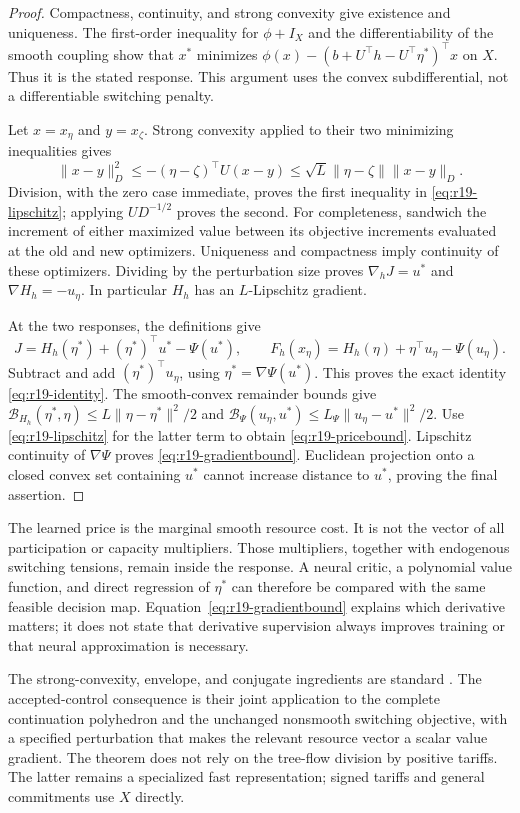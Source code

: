 \documentclass[11pt,letterpaper]{article}
\theoremstyle{definition}
\newcommand{\1}{\mathbf 1}
\begin{document}
\begin{proof}
Compactness, continuity, and strong convexity give existence and uniqueness. The first-order inequality for $\phi+I_X$ and the differentiability of the smooth coupling show that $x^*$ minimizes $\phi(x)-(b+U^\top h- U^\top\eta^*)^\top x$ on $X$. Thus it is the stated response. This argument uses the convex subdifferential, not a differentiable switching penalty.

Let $x=x_\eta$ and $y=x_\zeta$. Strong convexity applied to their two minimizing inequalities gives
\[
 \|x-y\|_D^2\leq-(\eta-\zeta)^\top U(x-y)
 \leq\sqrt L\|\eta-\zeta\|\|x-y\|_D.
\]
Division, with the zero case immediate, proves the first inequality in \eqref{eq:r19-lipschitz}; applying $UD^{-1/2}$ proves the second. For completeness, sandwich the increment of either maximized value between its objective increments evaluated at the old and new optimizers. Uniqueness and compactness imply continuity of these optimizers. Dividing by the perturbation size proves $\nabla_hJ=u^*$ and $\nabla H_h=-u_\eta$. In particular $H_h$ has an $L$-Lipschitz gradient.

At the two responses, the definitions give
\[
 J=H_h(\eta^*)+(\eta^*)^\top u^*-\Psi(u^*),\qquad
 F_h(x_\eta)=H_h(\eta)+\eta^\top u_\eta-\Psi(u_\eta).
\]
Subtract and add $(\eta^*)^\top u_\eta$, using $\eta^*=\nabla\Psi(u^*)$. This proves the exact identity \eqref{eq:r19-identity}. The smooth-convex remainder bounds give
$\mathcal B_{H_h}(\eta^*,\eta)\leq L\|\eta-\eta^*\|^2/2$ and
$\mathcal B_\Psi(u_\eta,u^*)\leq L_\Psi\|u_\eta-u^*\|^2/2$.
Use \eqref{eq:r19-lipschitz} for the latter term to obtain \eqref{eq:r19-pricebound}. Lipschitz continuity of $\nabla\Psi$ proves \eqref{eq:r19-gradientbound}. Euclidean projection onto a closed convex set containing $u^*$ cannot increase distance to $u^*$, proving the final assertion.
\end{proof}
The learned price is the marginal smooth resource cost. It is not the vector of all participation or capacity multipliers. Those multipliers, together with endogenous switching tensions, remain inside the response. A neural critic, a polynomial value function, and direct regression of $\eta^*$ can therefore be compared with the same feasible decision map. Equation~\eqref{eq:r19-gradientbound} explains which derivative matters; it does not state that derivative supervision always improves training or that neural approximation is necessary.

The strong-convexity, envelope, and conjugate ingredients are standard \citep{BoydVandenberghe2004}. The accepted-control consequence is their joint application to the complete continuation polyhedron and the unchanged nonsmooth switching objective, with a specified perturbation that makes the relevant resource vector a scalar value gradient. The theorem does not rely on the tree-flow division by positive tariffs. The latter remains a specialized fast representation; signed tariffs and general commitments use $X$ directly.
\end{document}

